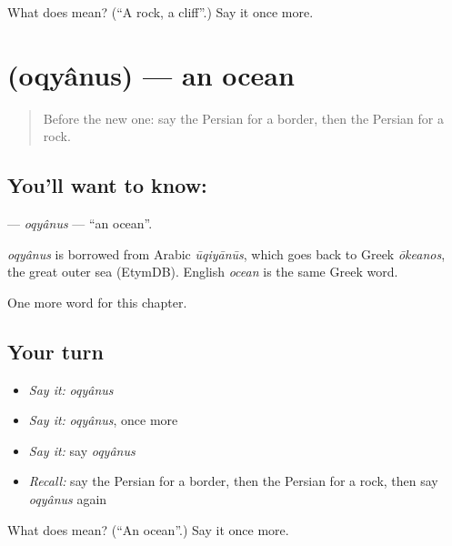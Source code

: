 \begin{tcolorbox}[breakable,colback=teal!4,colframe=teal!35!black,title={Before you move on}]
What does  mean? (\textquotedblleft{}A rock, a cliff\textquotedblright{}.) Say it once more.
\end{tcolorbox}
\section[\texorpdfstring{\fa{اقیانوس} (oqyânus)}{اقیانوس (oqyânus)}]{ (oqyânus) — an ocean}

\label{lesson:FA-C267-oqyanus}



\begin{quote}
Before the new one: say the Persian for a border, then the Persian for a rock.
\end{quote}

\subsection*{You'll want to know: }
\textbf{} — \emph{oqyânus} — \textquotedblleft{}an ocean\textquotedblright{}.

\begin{cousinweb}
\emph{oqyânus} is borrowed from Arabic \emph{ūqiyānūs}, which goes back to Greek \emph{ōkeanos}, the great outer sea (EtymDB). English \emph{ocean} is the same Greek word.
\end{cousinweb}

\begin{grammarlens}[title={What you've built}]
One more word for this chapter.
\end{grammarlens}

\subsection*{Your turn}
\begin{itemize}
\raggedright
  \item \emph{Say it:} \emph{oqyânus}
  \item \emph{Say it:} \emph{oqyânus}, once more
  \item \emph{Say it:} say \emph{oqyânus}
  \item \emph{Recall:} say the Persian for a border, then the Persian for a rock, then say \emph{oqyânus} again
\end{itemize}

\begin{tcolorbox}[breakable,colback=teal!4,colframe=teal!35!black,title={Before you move on}]
What does  mean? (\textquotedblleft{}An ocean\textquotedblright{}.) Say it once more.
\end{tcolorbox}

